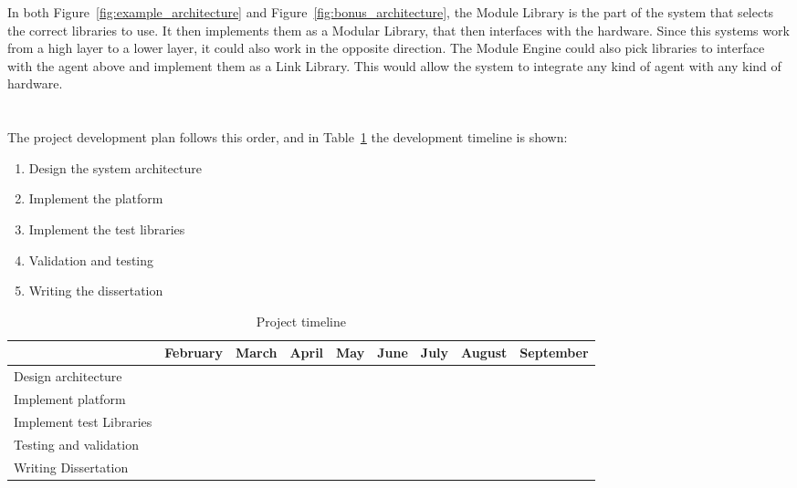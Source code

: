 In both Figure~\ref{fig:example_architecture} and Figure~\ref{fig:bonus_architecture}, the Module Library is the part of the system that selects the correct libraries to use. It then implements them as a Modular Library, that then interfaces with the hardware. Since this systems work from a high layer to a lower layer, it could also work in the opposite direction. The Module Engine could also pick libraries to interface with the agent above and implement them as a Link Library. This would allow the system to integrate any kind of agent with any kind of hardware.\\\\\\

The project development plan follows this order, and in Table~\ref{tab:timeline} the development timeline is shown:
\begin{enumerate}
	\item Design the system architecture
	\item Implement the platform
	\item Implement the test libraries
	\item Validation and testing
	\item Writing the dissertation
\end{enumerate}

\begin{table}[h!]
	\centering
	\caption{Project timeline}
	\begin{tabular}{||l||c|c|c|c|c|c|c|c||}
		\toprule
		\hline
		{} 				         & February 		 & March 			 & April             & May               & June              & July              & August            & September\\
		\hline
		Design architecture 	 & \cellcolor{green} & \cellcolor{green} & 		             &                   &                   &                   &                   & \\
		\hline
		Implement platform 		 & 					 & \cellcolor{green} & \cellcolor{green} & \cellcolor{green} &                   &                   &                   & \\
		\hline
		Implement test Libraries & 					 &                   &                   & \cellcolor{green} & \cellcolor{green} &                   &                   & \\
		\hline
		Testing and validation 	 & 					 &                   &                   &                   & \cellcolor{green} & \cellcolor{green} &                   &  \\
		\hline
		Writing Dissertation     & 					 &                   &                   &                   &                   & \cellcolor{green} & \cellcolor{green} & \cellcolor{green} \\
		\hline
		\bottomrule
	\end{tabular}
	\label{tab:timeline}
\end{table}

